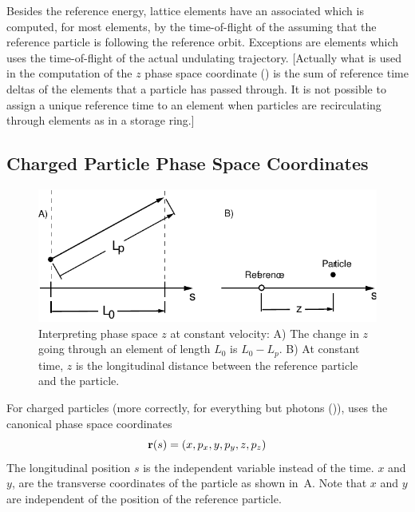 Besides the reference energy, lattice elements have an associated  which is
computed, for most elements, by the time-of-flight of the  assuming that the
reference particle is following the reference orbit. Exceptions are  elements which uses
the time-of-flight of the actual undulating trajectory. [Actually what is used in the computation of
the $z$ phase space coordinate () is the sum of reference time deltas of the elements that
a particle has passed through. It is not possible to assign a unique reference time to an element
when particles are recirculating through elements as in a storage ring.]

\subsection{Charged Particle Phase Space Coordinates}
\label{s:phase.space}

\begin{figure}
\centering \includegraphics{canonical-z.pdf} \caption[Interpreting phase space $z$ at constant
velocity.]  {Interpreting phase space $z$ at constant velocity: A) The change in $z$ going through
an element of length $L_0$ is $L_0 - L_p$.  B) At constant time, $z$ is the longitudinal distance
between the reference particle and the particle.}  \label{f:canonical.z}
\end{figure}

For charged particles (more correctly, for everything but photons ()),
\bmad uses the canonical phase space coordinates
\begin{equation}
  {\bf r}(s) = (x, p_x, y, p_y, z, p_z)
\end{equation}
The longitudinal position $s$ is the independent variable instead of the time. $x$ and $y$, are the
transverse coordinates of the particle as shown in~A. Note that $x$ and $y$ are
independent of the position of the reference particle.

